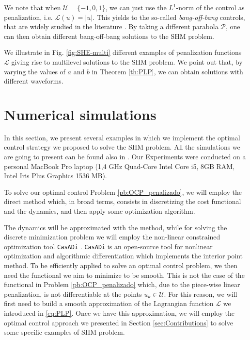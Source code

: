 \documentclass[twocolumn]{autart}    %
\begin{document}
\medskip

\begin{remark}
We note that when  $\mathcal{U}= \{-1,0,1\}$, we can just use the $L^1$-norm of the control as penalization, i.e. $\mathcal{L}(u) = |u|$. This yields to the so-called \emph{bang-off-bang} controls, that are widely studied in the literature \cite{nagahara2013maximum,ikeda2016maximum}. By taking a different parabola $\mathcal{P}$, one can then obtain different bang-off-bang solutions to the SHM problem.
\end{remark}

We illustrate in Fig. \ref{fig:SHE-multi} different examples of penalization functions $\mathcal{L}$ giving rise to multilevel solutions to the SHM problem. We point out that, by varying the values of $a$ and $b$ in Theorem \ref{th:PLP}, we can obtain solutions with different waveforms.

\bigskip

\section{Numerical simulations}\label{sec:Simulations}

In this section, we present several examples in which we implement the optimal control strategy we proposed to solve the SHM problem. All the simulations we are going to present can be found also in \cite{simus}. Our Experiments were conducted on a personal MacBook Pro laptop (1,4 GHz Quad-Core Intel Core i5, 8GB RAM, Intel Iris Plus Graphics 1536 MB). 

To solve our optimal control Problem \ref{pb:OCP_penalizado}, we will employ the direct method \cite{rao2009survey} which, in broad terms, consists in discretizing the cost functional and the dynamics, and then apply some optimization algorithm. 

The dynamics will be approximated with the  method, while for solving the discrete minimization problem we will employ the non-linear constrained optimization tool \texttt{CasADi} \cite{Andersson2019}. \texttt{CasADi} is an open-source tool for nonlinear optimization and algorithmic differentiation which implements the interior point method. To be efficiently applied to solve an optimal control problem, we then need the functional we aim to minimize to be smooth. This is not the case of the functional in Problem \ref{pb:OCP_penalizado} which, due to the piece-wise linear penalization, is not differentiable at the points $u_k\in\mathcal U$. For this reason, we will first need to build a smooth approximation of the Lagrangian function $\mathcal L$ we introduced in \eqref{eq:PLP}. Once we have this approximation, we will employ the optimal control approach we presented in Section \ref{sec:Contributions} to solve some specific examples of SHM problem.
\end{document}
